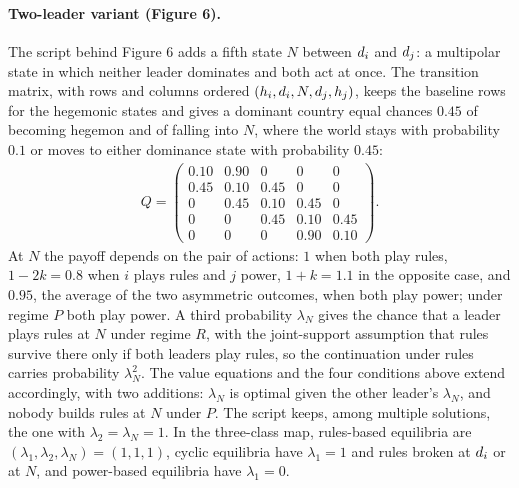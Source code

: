 \paragraph*{Two-leader variant (Figure 6).}
The script behind Figure 6 adds a fifth state $N$ between $d_i$ and
$d_j$: a multipolar state in which neither leader dominates and both act at
once. The transition matrix, with rows and columns ordered $(h_i, d_i, N,
d_j, h_j)$, keeps the baseline rows for the hegemonic states and gives a
dominant country equal chances $0.45$ of becoming hegemon and of falling
into $N$, where the world stays with probability $0.1$ or moves to either
dominance state with probability $0.45$:
\begin{align*}
  Q = \begin{pmatrix}
    0.10 & 0.90 & 0    & 0    & 0    \\
    0.45 & 0.10 & 0.45 & 0    & 0    \\
    0    & 0.45 & 0.10 & 0.45 & 0    \\
    0    & 0    & 0.45 & 0.10 & 0.45 \\
    0    & 0    & 0    & 0.90 & 0.10
  \end{pmatrix}.
\end{align*}
At $N$ the payoff depends on the pair of actions: $1$ when both play rules,
$1 - 2k = 0.8$ when $i$ plays rules and $j$ power, $1 + k = 1.1$ in the
opposite case, and $0.95$, the average of the two asymmetric outcomes, when
both play power; under regime $P$ both play power. A third probability
$\lambda_N$ gives the chance that a leader plays rules at $N$ under regime
$R$, with the joint-support assumption that rules survive there only if both
leaders play rules, so the continuation under rules carries probability
$\lambda_N^2$. The value equations and the four conditions above extend
accordingly, with two additions: $\lambda_N$ is optimal given the other
leader's $\lambda_N$, and nobody builds rules at $N$ under $P$. The script
keeps, among multiple solutions, the one with $\lambda_2 = \lambda_N = 1$.
In the three-class map, rules-based equilibria are $(\lambda_1, \lambda_2,
\lambda_N) = (1, 1, 1)$, cyclic equilibria have $\lambda_1 = 1$ and rules
broken at $d_i$ or at $N$, and power-based equilibria have $\lambda_1 = 0$.
